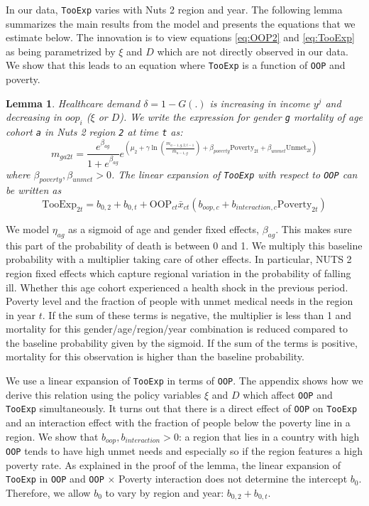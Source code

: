 \documentclass[a4paper,12pt]{article}
\newtheorem{lemma}{Lemma}
\begin{document}
In our data, \texttt{TooExp} varies with Nuts 2 region and year. The following lemma summarizes the main results from the model and presents the equations that we estimate below. The innovation is to view equations \eqref{eq:OOP2} and \eqref{eq:TooExp} as being parametrized by \(\xi\) and \(D\) which are not directly observed in our data. We show that this leads to an equation where \texttt{TooExp} is a function of \texttt{OOP} and poverty.

\begin{lemma}
Healthcare demand \(\delta = 1-G(.)\) is increasing in income \(y^j\) and decreasing in \(oop_i\) (\(\xi\) or \(D\)). We write the expression for gender \texttt{g} mortality of age cohort \texttt{a} in Nuts 2 region \texttt{2} at time \texttt{t} as:
$$
m_{ga2t} = \frac{e^{\beta_{ag}}}{1+e^{\beta_{ag}}} e^{\left( \mu_2 + \gamma \ln \left(\frac{m_{a-1,g,2,t-1}}{\bar{m}_{a-1,g}}\right)+ \beta_{poverty}\text{Poverty}_{2t} + \beta_{unmet}\text{Unmet}_{2t}\right)}
$$
where \(\beta_{poverty}, \beta_{unmet} > 0\). The linear expansion of \texttt{TooExp} with respect to \texttt{OOP} can be written as
$$
\text{TooExp}_{2t} = b_{0,2} + b_{0,t} + \text{OOP}_{ct} \bar{x}_{ct} \left(  b_{oop,c} + b_{interaction,c} \text{Poverty}_{2t} \right)
$$
\label{prop:1}
\end{lemma}

We model \({\eta}_{ag}\) as a sigmoid of age and gender fixed effects, \(\beta_{ag}\). This makes sure this part of the probability of death is between 0 and 1. We multiply this baseline probability with a multiplier taking care of other effects. In particular, NUTS 2 region fixed effects which capture regional variation in the probability of falling ill. Whether this age cohort experienced a health shock in the previous period. Poverty level and the fraction of people with unmet medical needs in the region in year \(t\). If the sum of these terms is negative, the multiplier is less than 1 and mortality for this gender/age/region/year combination is reduced compared to the baseline probability given by the sigmoid. If the sum of the terms is positive, mortality for this observation is higher than the baseline probability.

We use a linear expansion of \texttt{TooExp} in terms of \texttt{OOP}. The appendix shows how we derive this relation using the policy variables \(\xi\) and \(D\) which affect \texttt{OOP} and \texttt{TooExp} simultaneously. It turns out that there is a direct effect of \texttt{OOP} on \texttt{TooExp} and an interaction effect with the fraction of people below the poverty line in a region. We show that \(b_{oop},b_{interaction} > 0\): a region that lies in a country with high \texttt{OOP} tends to have high unmet needs and especially so if the region features a high poverty rate. As explained in the proof of the lemma, the linear expansion of \texttt{TooExp} in \texttt{OOP} and \texttt{OOP} \(\times\) Poverty interaction does not determine the intercept \(b_{0}\). Therefore, we allow \(b_0\) to vary by region and year: \(b_{0,2} + b_{0,t}\). 
\end{document}
